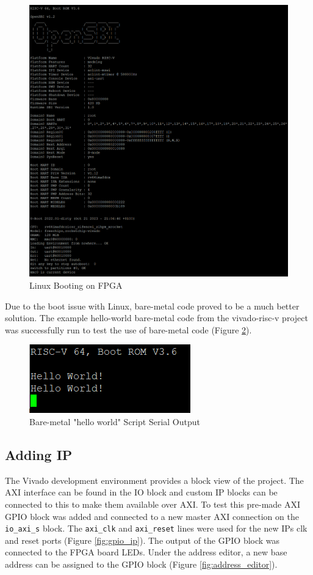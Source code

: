 \begin{figure}[H]
	\centering
	\includegraphics[scale=0.4]{linux.png}
	\caption{Linux Booting on FPGA}
	\label{fig:linux}
\end{figure}

Due to the boot issue with Linux, bare-metal code proved to be a much better solution. The example hello-world bare-metal code from the vivado-risc-v project was successfully run to test the use of bare-metal code (Figure \ref{fig:helloworld}).

\begin{figure}[H]
	\centering
	\includegraphics[scale=1]{bare-metal.png}
	\caption{Bare-metal "hello world" Script Serial Output}
	\label{fig:helloworld}
\end{figure}

\subsection{Adding IP}
The Vivado development environment provides a block view of the project. The AXI interface can be found in the IO block and custom IP blocks can be connected to this to make them available over AXI. To test this pre-made AXI GPIO block \cite{xilinx_gpio} was added and connected to a new master AXI connection on the \texttt{io\_axi\_s} block. The \texttt{axi\_clk} and \texttt{axi\_reset} lines were used for the new IPs clk and reset ports (Figure \ref{fig:gpio_ip}). The output of the GPIO block was connected to the FPGA board LEDs. Under the address editor, a new base address can be assigned to the GPIO block (Figure \ref{fig:address_editor}).

